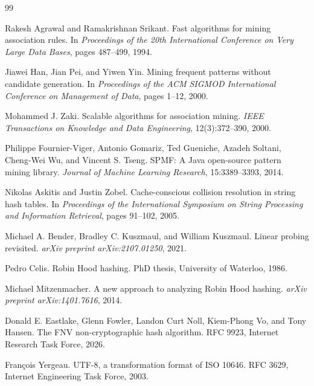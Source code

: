 \documentclass[11pt,a4paper]{article}
\begin{document}

\begin{thebibliography}{99}

Rakesh Agrawal and Ramakrishnan Srikant.
\newblock Fast algorithms for mining association rules.
\newblock In \emph{Proceedings of the 20th International Conference on Very Large Data Bases}, pages 487--499, 1994.

Jiawei Han, Jian Pei, and Yiwen Yin.
\newblock Mining frequent patterns without candidate generation.
\newblock In \emph{Proceedings of the ACM SIGMOD International Conference on Management of Data}, pages 1--12, 2000.

Mohammed J. Zaki.
\newblock Scalable algorithms for association mining.
\newblock \emph{IEEE Transactions on Knowledge and Data Engineering}, 12(3):372--390, 2000.

Philippe Fournier-Viger, Antonio Gomariz, Ted Gueniche, Azadeh Soltani, Cheng-Wei Wu, and Vincent S. Tseng.
\newblock SPMF: A Java open-source pattern mining library.
\newblock \emph{Journal of Machine Learning Research}, 15:3389--3393, 2014.

Nikolas Askitis and Justin Zobel.
\newblock Cache-conscious collision resolution in string hash tables.
\newblock In \emph{Proceedings of the International Symposium on String Processing and Information Retrieval}, pages 91--102, 2005.

Michael A. Bender, Bradley C. Kuszmaul, and William Kuszmaul.
\newblock Linear probing revisited.
\newblock \emph{arXiv preprint arXiv:2107.01250}, 2021.

Pedro Celis.
\newblock Robin Hood hashing.
\newblock PhD thesis, University of Waterloo, 1986.

Michael Mitzenmacher.
\newblock A new approach to analyzing Robin Hood hashing.
\newblock \emph{arXiv preprint arXiv:1401.7616}, 2014.

Donald E. Eastlake, Glenn Fowler, Landon Curt Noll, Kiem-Phong Vo, and Tony Hansen.
\newblock The FNV non-cryptographic hash algorithm.
\newblock RFC 9923, Internet Research Task Force, 2026.

Fran\c{c}ois Yergeau.
\newblock UTF-8, a transformation format of ISO 10646.
\newblock RFC 3629, Internet Engineering Task Force, 2003.


\end{thebibliography}
\end{document}
